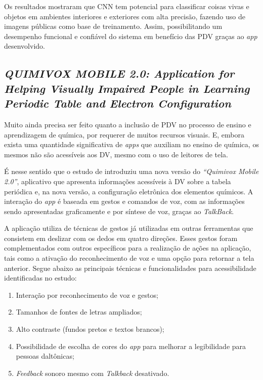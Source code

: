 Os resultados mostraram que CNN tem potencial para classificar coisas vivas e objetos em ambientes interiores e exteriores com alta precisão, fazendo uso de imagens públicas
como base de treinamento.
Assim, possibilitando um desempenho funcional e confiável do sistema em benefício das PDV graças ao \emph{app} desenvolvido.

\subsection{\emph{QUIMIVOX MOBILE 2.0: Application for Helping Visually Impaired People in Learning Periodic Table and Electron Configuration}}

Muito ainda precisa ser feito quanto a inclusão de PDV no processo de ensino e aprendizagem de química, por requerer de muitos recursos visuais.
E, embora exista uma quantidade significativa de \emph{apps} que auxiliam no ensino de química, os mesmos não são acessíveis aos DV, mesmo com o uso de leitores de tela.

É nesse sentido que o estudo de  introduziu uma nova versão do \emph{``Quimivox Mobile 2.0''}, aplicativo que apresenta informações acessíveis à DV sobre a tabela periódica e, na nova versão, a configuração eletrônica dos elementos químicos.
A interação do \emph{app} é baseada em gestos e comandos de voz, com as informações sendo apresentadas graficamente e por síntese de voz, graças ao \emph{TalkBack}.

A aplicação utiliza de técnicas de gestos já utilizadas em outras ferramentas que consistem em deslizar com os dedos em quatro direções.
Esses gestos foram complementados com outros específicos para a realização de ações na aplicação, tais como a ativação do reconhecimento de voz e uma opção para retornar a tela anterior.
Segue abaixo as principais técnicas e funcionalidades para acessibilidade identificadas no estudo:

\begin{enumerate}
    \item Interação por reconhecimento de voz e gestos;
    \item Tamanhos de fontes de letras ampliados;
    \item Alto contraste (fundos pretos e textos brancos);
    \item Possibilidade de escolha de cores do \emph{app} para melhorar a legibilidade para pessoas daltônicas;
    \item \emph{Feedback} sonoro mesmo com \emph{Talkback} desativado.
\end{enumerate}

